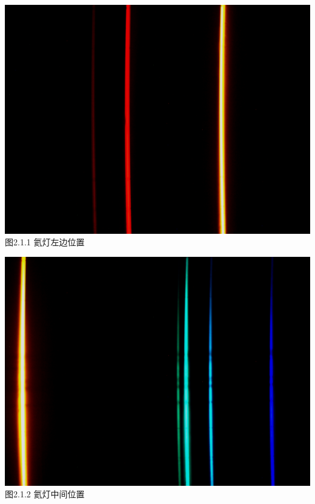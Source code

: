 \documentclass{ctexart}
\begin{document}
~\\
\begin{minipage}[c]{0.33\textwidth}
    \includegraphics[scale=0.05]{1-1} \\\small{图2.1.1 氦灯左边位置}\centering
\end{minipage}
\begin{minipage}[c]{0.33\textwidth}
    \includegraphics[scale=0.05]{2-1} \\\small{图2.1.2 氦灯中间位置}\centering
\end{minipage}
\end{document}
